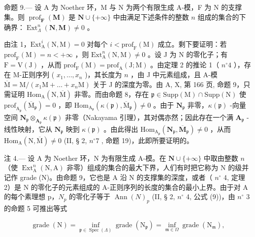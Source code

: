 命题 9.--- 设 A 为 Noether 环，M 与 N 为两个有限生成 A-模，F 为 N 的支撑集。则 \(\operatorname{prof}_{\mathbf{F}}(\mathbf{M})\) 是 \(\mathbf{N} \cup \{+\infty\}\) 中由满足下述条件的整数 \(n\) 组成的集合的下确界：\(\operatorname{Ext}_{\Lambda}^{n}(\mathbf{N}, \mathbf{M}) \neq 0\) 。

由注 1，\(\mathrm{Ext}_{\mathrm{A}}^{i}(\mathrm{N},\mathrm{M}) = 0\) 对每个 \(i < \mathrm{prof}_{\mathrm{F}}(\mathrm{M})\) 成立。剩下要证明：若 \(\mathrm{prof}_{\mathrm{F}}(\mathrm{M}) = n < +\infty\) ，则 \(\mathrm{Ext}_{\mathrm{A}}^{n}(\mathrm{N},\mathrm{M}) \neq 0\) 。设 J 为 N 的零化子；有 \(\mathrm{F} = \mathrm{V}(\mathrm{J})\) ，从而 \(\mathrm{prof}_{\mathrm{F}}(\mathrm{M}) = \mathrm{prof}_{\mathrm{A}}(\mathrm{J};\mathrm{M})\) 。由定理 2 的推论 1（ \(n^{\circ}4\) ），存在 M-正则序列 ( \(x_{1},\ldots,x_{n}\) )，其长度为 \(n\) ，由 J 中元素组成，且 A-模 \(\overline{\mathrm{M}} = \mathrm{M}/(x_{1}\mathrm{M}+\ldots+x_{n}\mathrm{M})\) 关于 J 的深度为零。由 A, X, 第 166 页, 命题 9，只需证明 \(\mathrm{Hom}_{\mathrm{A}}(\mathrm{N},\overline{\mathrm{M}})\) 非零。而由命题 8，存在 \(\mathfrak{p} \in \mathrm{Supp}(\mathrm{M}) \cap \mathrm{Supp}(\mathrm{N})\) 使 \(\mathrm{prof}_{\mathrm{A}_{\mathfrak{p}}}(\overline{\mathrm{M}}_{\mathfrak{p}}) = 0\) ，即 \(\mathrm{Hom}_{\mathrm{A}_{\mathfrak{p}}}(\kappa(\mathfrak{p}),\overline{\mathrm{M}}_{\mathfrak{p}}) \neq 0\) 。由于 \(\mathbf{N}_{\mathfrak{p}}\) 非零，\(\kappa(\mathfrak{p})\) -向量空间 \(\mathbf{N}_{\mathfrak{p}} \otimes_{\mathbf{A}_{\mathfrak{p}}} \kappa(\mathfrak{p})\) 非零（Nakayama 引理），其对偶亦然；因此存在一个满 \(\mathbf{A}_{\mathfrak{p}}\) -线性映射，它从 \(\mathbf{N}_{\mathfrak{p}}\) 映到 \(\kappa(\mathfrak{p})\) 。由此得出 \(\mathrm{Hom}_{\mathrm{A}_{\mathfrak{p}}}(\mathbf{N}_{\mathfrak{p}},\overline{\mathbf{M}}_{\mathfrak{p}}) \neq 0\) ，从而 \(\mathrm{Hom}_{\mathrm{A}}(\mathrm{N},\overline{\mathrm{M}}) \neq 0\) (II, § 2, \(n^{\circ}7\) , 命题 19)，此即所要证明的。

注 4.--- 设 A 为 Noether 环，N 为有限生成 A-模。在 \(\mathbf{N}\cup\{+\infty\}\) 中取由整数 \(n\) （使 \(\operatorname{Ext}_{\mathrm{A}}^{n}(\mathrm{N},\mathrm{A})\) 非零）组成的集合的最大下界，人们有时把它称为 N 的级并记作 grade (N)。由命题 9，它也是 A 沿 N 的支撑集的深度，或者（ \(n^{\circ}\) 4, 定理 2）是 N 的零化子的元素组成的 A-正则序列的长度的集合的最小上界。由于对 A 的每个素理想 p，\(N_{p}\) 的零化子等于 \(\operatorname{Ann}(N)_{p}\) (II, § 2, \(n^{\circ}\) 4, 公式 (9))，由 \(n^{\circ}\) 3 的命题 5 可推出等式

\[
\operatorname{grade} (\mathrm{N}) = \inf _ {\mathfrak {p} \in \operatorname{Spec} (\Lambda)} \operatorname{grade} \left(\mathrm{N} _ {\mathfrak {p}}\right) = \inf _ {\mathfrak {m} \in \Omega} \operatorname{grade} \left(\mathrm{N} _ {\mathfrak {m}}\right),
\]

